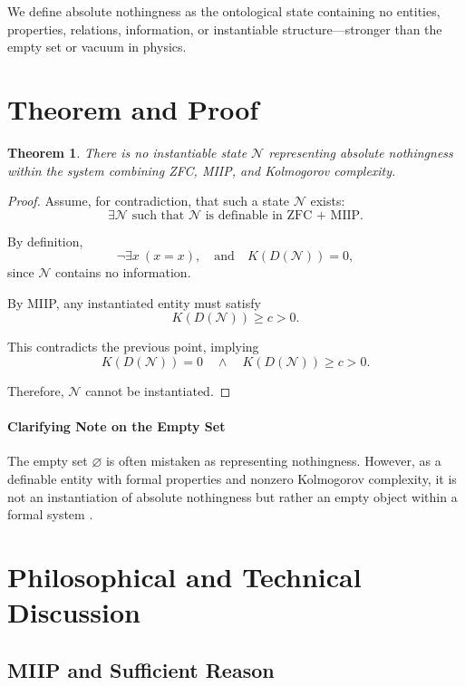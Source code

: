 \documentclass[12pt,a4paper]{article}
\newtheorem{theorem}{Theorem}
\begin{document}
We define absolute nothingness as the ontological state containing no entities, properties, relations, information, or instantiable structure---stronger than the empty set or vacuum in physics.

\section{Theorem and Proof}

\begin{theorem}
There is no instantiable state $\mathcal{N}$ representing absolute nothingness within the system combining ZFC, MIIP, and Kolmogorov complexity.
\end{theorem}

\begin{proof}
Assume, for contradiction, that such a state $\mathcal{N}$ exists:
\[
\exists \mathcal{N} \text{ such that } \mathcal{N} \text{ is definable in ZFC + MIIP.}
\]

By definition,
\[
\neg \exists x \ (x = x), \quad \text{and} \quad K(D(\mathcal{N})) = 0,
\]
since $\mathcal{N}$ contains no information.

By MIIP, any instantiated entity must satisfy
\[
K(D(\mathcal{N})) \geq c > 0.
\]

This contradicts the previous point, implying
\[
K(D(\mathcal{N})) = 0 \quad\wedge\quad K(D(\mathcal{N})) \geq c > 0.
\]

Therefore, $\mathcal{N}$ cannot be instantiated.
\end{proof}

\paragraph{Clarifying Note on the Empty Set}

The empty set $\varnothing$ is often mistaken as representing nothingness. However, as a definable entity with formal properties and nonzero Kolmogorov complexity, it is not an instantiation of absolute nothingness but rather an empty object within a formal system \cite{Jech2003}.

\section{Philosophical and Technical Discussion}

\subsection{MIIP and Sufficient Reason}
\end{document}

